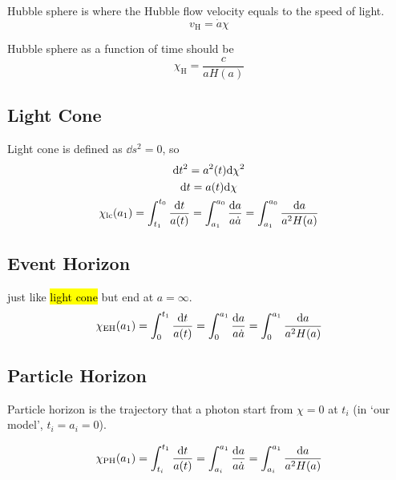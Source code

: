 Hubble sphere is where the Hubble flow velocity equals to the speed of light. 
\begin{equation}
    v_{\mathrm{H}} = \dot{a} \chi  
\end{equation}

Hubble sphere as a function of time should be 
\begin{equation}
    \chi_{\mathrm{H}} =\frac{c}{a H(a)}
\end{equation}

\subsection{Light Cone}

Light cone is defined as $\dd s^2 = 0$, so 
\begin{gather}
    \dd t^2 = a^2(t) \dd \chi^2 \\ 
    \dd t = a(t) \dd \chi \\ 
    \chi_{\rm lc}(a_1) = \int_{t_1}^{t_0} \frac{\dd t}{a(t)} = \int_{a_1}^{a_0} \frac{\dd a }{a \dot{a}} = \int_{a_1}^{a_0} \frac{\dd a }{a^2 H(a)} 
\end{gather} 


\subsection{Event Horizon}

just like \hl{light cone} but end at $a=\infty$. 
\begin{equation}
    \chi_{\rm EH}(a_1) = \int_{0}^{t_1} \frac{\dd t}{a(t)} = \int_{0}^{a_1} \frac{\dd a }{a \dot{a}} = \int_{0}^{a_1} \frac{\dd a }{a^2 H(a)} 
\end{equation}

\subsection{Particle Horizon}

Particle horizon is the trajectory that a photon start from $\chi = 0$ at $t_i$ (in `our model', $t_i = a_i =0$).

\begin{equation}
    \chi_{\rm PH}(a_1) = \int_{t_i}^{t_1} \frac{\dd t}{a(t)} = \int_{a_i}^{a_1} \frac{\dd a }{a \dot{a}} = \int_{a_i}^{a_1} \frac{\dd a }{a^2 H(a)} 
\end{equation}

